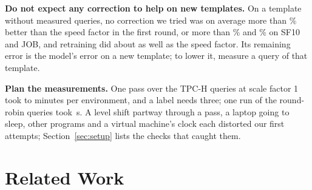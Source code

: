 \documentclass[conference]{IEEEtran}
\begin{document}
\textbf{Do not expect any correction to help on new templates.} On a
template without measured queries, no correction we tried was on average
more than \XtraHardBestPct\% better than the speed factor in the first
round, or more than \XcNewTpchTenHardBestPct\% and \XcNewJobHardBestPct\%
on SF10 and JOB, and retraining did about as well as the speed factor. Its
remaining error is the model's error on a new template; to lower it,
measure a query of that template.

\textbf{Plan the measurements.} One pass over the TPC-H queries at scale
factor 1 took \EnvPassTpchMin{} to \EnvPassTpchMax{} minutes per
environment, and a label needs three; one run of the round-robin queries
took \PLTpchKTwoFiveRoundRobinCalibrationS\,s. A level shift partway
through a pass, a laptop going to sleep, other programs and a virtual
machine's clock each distorted our first attempts; Section~\ref{sec:setup}
lists the checks that caught them.

\section{Related Work}
\label{sec:related}
\end{document}
